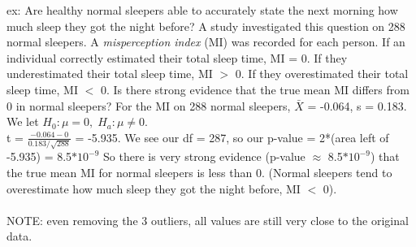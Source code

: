 \documentclass[12pt, a4paper]{article}
\begin{document}
		ex: Are healthy normal sleepers able to accurately state the next morning how much sleep they got the night before? A study investigated this question on 288 normal sleepers. A \textit{misperception index} (MI) was recorded for each person. If an individual correctly estimated their total sleep time, MI = 0. If they underestimated their total sleep time, MI $>$ 0. If they overestimated their total sleep time, MI $<$ 0. Is there strong evidence that the true mean MI differs from 0 in normal sleepers? For the MI on 288 normal sleepers, $\bar{X}$ = -0.064, s = 0.183. We let $H_0: \mu = 0,\; H_a: \mu \neq 0$. \\
		t = $\frac{-0.064-0}{0.183/\sqrt{288}}$ = -5.935. We see our df = 287, so our p-value = 2*(area left of -5.935) = 8.5$*10^{-9}$ So there is very strong evidence (p-value $\approx$ 8.5$*10^{-9}$) that the true mean MI for normal sleepers is less than 0. (Normal sleepers tend to overestimate how much sleep they got the night before, MI $<$ 0). \\~\\
		NOTE: even removing the 3 outliers, all values are still very close to the original data. \\~\\
		
\end{document}
